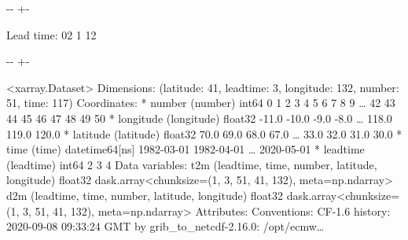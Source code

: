 \documentclass[letterpaper,10pt,english]{sphinxmanual}
\newlength\nbsphinxcodecellspacing
\begin{document}
{

\kern-\sphinxverbatimsmallskipamount\kern-\baselineskip
\kern+\FrameHeightAdjust\kern-\fboxrule
\vspace{\nbsphinxcodecellspacing}

\begin{sphinxVerbatim}[commandchars=\\\{\}]
Lead time: 02
1
12
\end{sphinxVerbatim}
}

{

\kern-\sphinxverbatimsmallskipamount\kern-\baselineskip
\kern+\FrameHeightAdjust\kern-\fboxrule
\vspace{\nbsphinxcodecellspacing}

\begin{sphinxVerbatim}[commandchars=\\\{\}]
\llap{\color{nbsphinxout}[7]:\,\hspace{\fboxrule}\hspace{\fboxsep}}<xarray.Dataset>
Dimensions:    (latitude: 41, leadtime: 3, longitude: 132, number: 51, time: 117)
Coordinates:
  * number     (number) int64 0 1 2 3 4 5 6 7 8 9 {\ldots} 42 43 44 45 46 47 48 49 50
  * longitude  (longitude) float32 -11.0 -10.0 -9.0 -8.0 {\ldots} 118.0 119.0 120.0
  * latitude   (latitude) float32 70.0 69.0 68.0 67.0 {\ldots} 33.0 32.0 31.0 30.0
  * time       (time) datetime64[ns] 1982-03-01 1982-04-01 {\ldots} 2020-05-01
  * leadtime   (leadtime) int64 2 3 4
Data variables:
    t2m        (leadtime, time, number, latitude, longitude) float32 dask.array<chunksize=(1, 3, 51, 41, 132), meta=np.ndarray>
    d2m        (leadtime, time, number, latitude, longitude) float32 dask.array<chunksize=(1, 3, 51, 41, 132), meta=np.ndarray>
Attributes:
    Conventions:  CF-1.6
    history:      2020-09-08 09:33:24 GMT by grib\_to\_netcdf-2.16.0: /opt/ecmw{\ldots}
\end{sphinxVerbatim}
}

{
\begin{sphinxVerbatim}[commandchars=\\\{\}]
\llap{\color{nbsphinxin}[8]:\,\hspace{\fboxrule}\hspace{\fboxsep}}              
\end{sphinxVerbatim}
}
\end{document}
